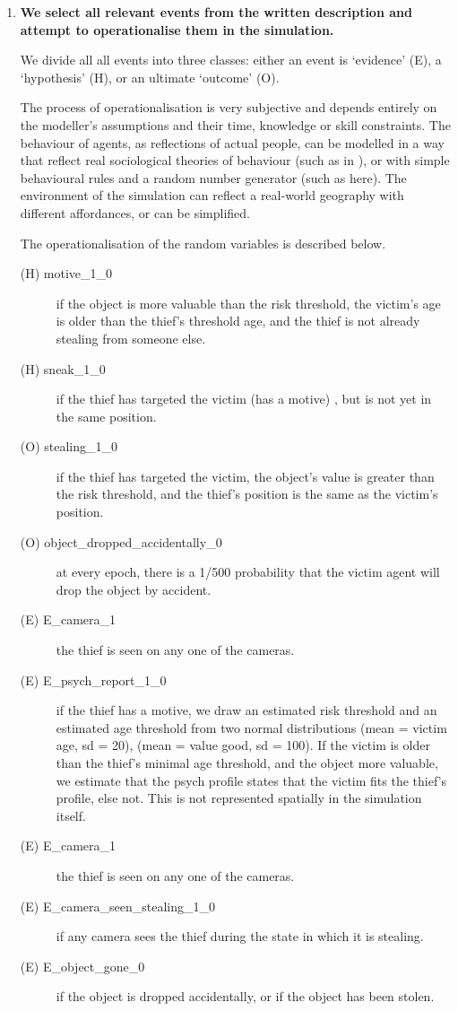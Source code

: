 \documentclass[11pt]{article}
\begin{document}
\begin{enumerate}
\item \textbf{We select all relevant events from the written description and attempt to operationalise them in the simulation.}

We divide all all events into three classes: either an event is `evidence' (E), a `hypothesis' (H), or an ultimate `outcome' (O). 

The process of operationalisation is very subjective and depends entirely on the modeller's assumptions and their time, knowledge or skill constraints. The behaviour of agents, as reflections of actual people, can be modelled in a way that reflect real sociological theories of behaviour (such as in \citet{Gerritsen2015}), or with simple behavioural rules and a random number generator (such as here). The environment of the simulation can reflect a real-world geography with different affordances, or can be simplified. 

The operationalisation of the random variables is described below. 
\begin{description}
\item[(H) motive\_1\_0 ] if the object is more valuable than the risk threshold, the victim's age is older than the thief's threshold age, and the thief is not already stealing from someone else. 
\item[(H) sneak\_1\_0 ] if the thief has targeted the victim (has a motive) , but is not yet in the same position.
\item[(O) stealing\_1\_0 ] if the thief has targeted the victim, the object's value is greater than the risk threshold, and the thief's position is the same as the victim's position. 
\item[(O) object\_dropped\_accidentally\_0 ] at every epoch, there is a 1/500 probability that the victim agent will drop the object by accident.
\item[(E) E\_camera\_1 ] the thief is seen on any one of the cameras.
\item[(E) E\_psych\_report\_1\_0 ] if the thief has a motive, we draw an estimated risk threshold and an estimated age threshold from two normal distributions (mean = victim age, sd = 20), (mean = value good, sd = 100). If the victim is older than the thief's minimal age threshold, and the object more valuable, we estimate that the psych profile states that the victim fits the thief's profile, else not. This is not represented spatially in the simulation itself.
\item[(E) E\_camera\_1 ] the thief is seen on any one of the cameras.
\item[(E) E\_camera\_seen\_stealing\_1\_0 ]  if any camera sees the thief during the state in which it is stealing.
\item[(E) E\_object\_gone\_0 ] if the object is dropped accidentally, or if the object has been stolen.
\end{description}

\end{enumerate}
\end{document}
